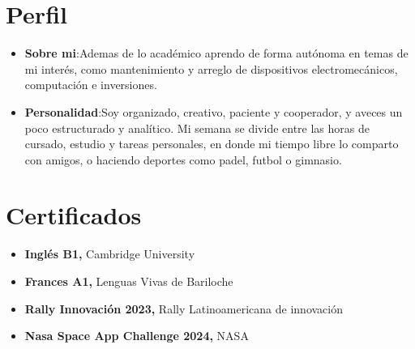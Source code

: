 \documentclass[a4paper,11pt]{article}
\newcommand{\resumeItem}[2]{
  \item{
    \textbf{#1}{:\hspace{0.5mm}#2 \vspace{-0.5mm}}
  }
}
\newcommand{\resumeSubItem}[2]{\resumeItem{#1}{#2}\vspace{-4pt}}
\newcommand{\resumeHeadingSkillStart}{\begin{itemize}[leftmargin=*,itemsep=1.7mm, rightmargin=2ex]}
\newcommand{\resumeItemListStart}{\begin{justify}\begin{itemize}[leftmargin=3ex, rightmargin=2ex, noitemsep,labelsep=1.2mm,itemsep=0mm]\small}
\newcommand{\resumeHeadingSkillEnd}{\end{itemize}\vspace{-2mm}}
\newcommand{\resumeItemListEnd}{\end{itemize}\end{justify}\vspace{-2mm}}
\begin{document}
\vspace{6mm}


\section{\textbf{Perfil}}
\resumeHeadingSkillStart
 \resumeSubItem{Sobre mi}
    {Ademas de lo académico aprendo de forma autónoma en temas de mi interés, como mantenimiento y arreglo de dispositivos electromecánicos, computación e inversiones.}
 \resumeSubItem{Personalidad}
 {Soy organizado, creativo, paciente y cooperador, y aveces un poco estructurado y analítico. Mi semana se divide entre las horas de cursado, estudio y tareas personales, en donde mi tiempo libre lo comparto con amigos, o haciendo deportes como padel, futbol o gimnasio.}
\resumeHeadingSkillEnd

\vspace{6mm}

\section{\textbf{Certificados}}
    \resumeItemListStart
        \item {{\textbf{Inglés B1, }}}{Cambridge University}
        \vspace{1mm}
        \item {{\textbf{Frances A1, }}}{Lenguas Vivas de Bariloche}
        \vspace{1mm}
        \item {{\textbf{Rally Innovación 2023, }}}{Rally Latinoamericana de innovación}
        \vspace{1mm}
        \item {{\textbf{Nasa Space App Challenge 2024, }}}{NASA}
    \resumeItemListEnd
\vspace{1mm}


\vfill
{}
\end{document}
